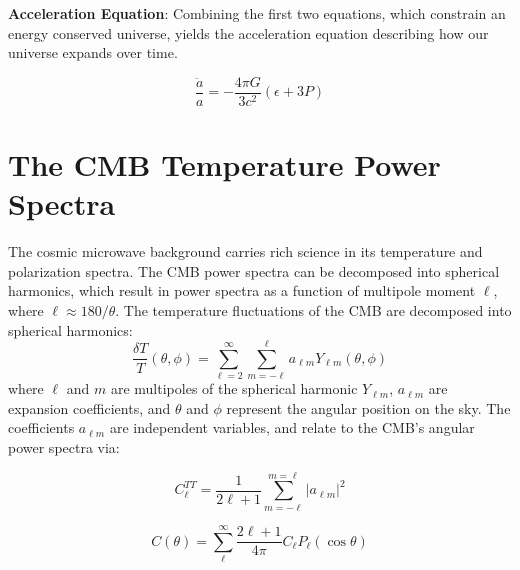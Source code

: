 \noindent
\textbf{Acceleration Equation}: Combining the first two equations, which constrain an energy conserved universe, yields the acceleration equation describing how our universe expands over time.  

\begin{equation}
    \frac{\ddot{a}}{a} = - \frac{4\pi G}{3 c^2} (\epsilon + 3 P)
\end{equation}

\section{The CMB Temperature Power Spectra}

The cosmic microwave background carries rich science in its temperature and polarization spectra.  The CMB power spectra can be decomposed into spherical harmonics, which result in power spectra as a function of multipole moment $\ell$, where $\ell\approx180/\theta$.  The temperature fluctuations of the CMB are decomposed into spherical harmonics:
\begin{equation}
\frac{\delta T}{T}(\theta,\phi) = \sum_{\ell=2}^{\infty} \sum_{m=-\ell}^{\ell} a_{\ell m} Y_{\ell m}(\theta,\phi)
    \label{eq:cmb_temp}
\end{equation}
where $\ell$ and $m$ are multipoles of the spherical harmonic $Y_{\ell m}$, $a_{\ell m}$ are expansion coefficients, and $\theta$ and $\phi$ represent the angular position on the sky.  The coefficients $a_{\ell m}$ are independent variables, and relate to the CMB's angular power spectra via:

\begin{equation}
    C_\ell^{TT} = \frac{1}{2\ell +1} \sum_{m=-\ell}^{m=\ell} |a_{\ell m}|^2
\end{equation}

\begin{equation}
    C(\theta) = \sum_{\ell}^{\infty} \frac{2\ell + 1}{4\pi} C_\ell P_{\ell}(\cos\theta)
    \label{eq:c_ells}
\end{equation}

